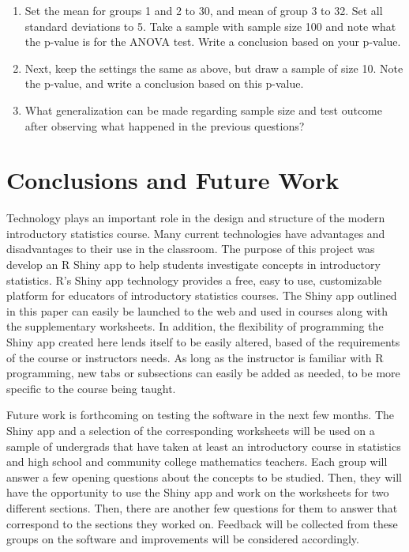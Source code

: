 \documentclass[11pt]{book}
\begin{document}
\begin{itemize}
\begin{enumerate}
\item Set the mean for groups 1 and 2 to 30, and mean of group 3 to 32.  Set all standard deviations to 5.  Take a sample with sample size 100 and note what the p-value is for the ANOVA test.  Write a conclusion based on your p-value.

\item Next, keep the settings the same as above, but draw a sample of size 10.  Note the p-value, and write a conclusion based on this p-value.  

\item What generalization can be made regarding sample size and test outcome after observing what happened in the previous questions?

\end{enumerate}

\end{itemize}

\section{Conclusions and Future Work}
Technology plays an important role in the design and structure of the modern introductory statistics course. Many current technologies have advantages and disadvantages to their use in the classroom. The purpose of this project was develop an R Shiny app to help students investigate concepts in introductory statistics. R's Shiny app technology provides a free, easy to use, customizable platform for educators of introductory statistics courses. The Shiny app outlined in this paper can easily be launched to the web and used in courses along with the supplementary worksheets. In addition, the flexibility of programming the Shiny app created here lends itself to be easily altered, based of the requirements of the course or instructors needs. As long as the instructor is familiar with R programming, new tabs or subsections can easily be added as needed, to be more specific to the course being taught. 

Future work is forthcoming on testing the software in the next few months. The Shiny app and a selection of the corresponding worksheets will be used on a sample of undergrads that have taken at least an introductory course in statistics and high school and community college mathematics teachers. Each group will answer a few opening questions about the concepts to be studied. Then, they will have the opportunity to use the Shiny app and work on the worksheets for two different sections. Then, there are another few questions for them to answer that correspond to the sections they worked on. Feedback will be collected from these groups on the software and improvements will be considered accordingly.  
\end{document}
